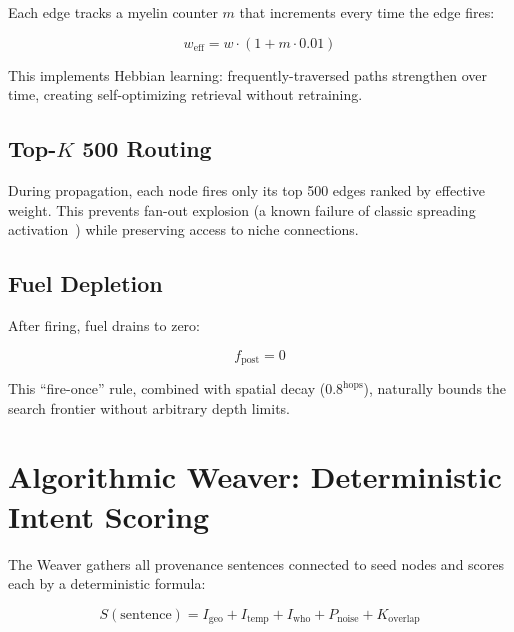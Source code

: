 \documentclass[11pt,a4paper]{article}
\begin{document}
Each edge tracks a myelin counter $m$ that increments every time the edge fires:

\begin{equation}
w_{\mathrm{eff}} = w \cdot (1 + m \cdot 0.01)
\label{eq:myelin}
\end{equation}

This implements Hebbian learning: frequently-traversed paths strengthen over time, creating self-optimizing retrieval without retraining.

\subsection{Top-$K$ 500 Routing}

During propagation, each node fires only its top 500 edges ranked by effective weight. This prevents fan-out explosion (a known failure of classic spreading activation~\cite{collins1975spreading}) while preserving access to niche connections.

\subsection{Fuel Depletion}

After firing, fuel drains to zero:

\begin{equation}
f_{\mathrm{post}} = 0
\end{equation}

This ``fire-once'' rule, combined with spatial decay ($0.8^{\mathrm{hops}}$), naturally bounds the search frontier without arbitrary depth limits.

\section{Algorithmic Weaver: Deterministic Intent Scoring}
\label{sec:weaver}

The Weaver gathers all provenance sentences connected to seed nodes and scores each by a deterministic formula:

\begin{equation}
S(\text{sentence}) = I_{\mathrm{geo}} + I_{\mathrm{temp}} + I_{\mathrm{who}} + P_{\mathrm{noise}} + K_{\mathrm{overlap}}
\label{eq:weaver}
\end{equation}
\end{document}
